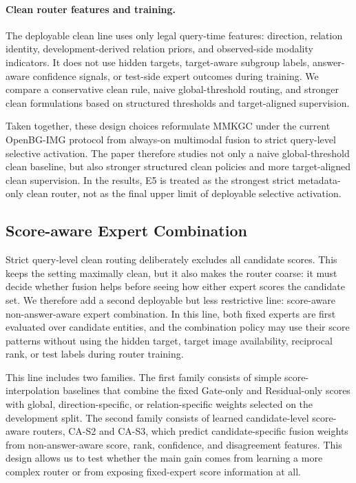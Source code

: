 \documentclass[11pt]{article}
\begin{document}
\paragraph{Clean router features and training.}
The deployable clean line uses only legal query-time features: direction, relation identity, development-derived relation priors, and observed-side modality indicators. It does not use hidden targets, target-aware subgroup labels, answer-aware confidence signals, or test-side expert outcomes during training. We compare a conservative clean rule, naive global-threshold routing, and stronger clean formulations based on structured thresholds and target-aligned supervision.

Taken together, these design choices reformulate MMKGC under the current OpenBG-IMG protocol from always-on multimodal fusion to strict query-level selective activation. The paper therefore studies not only a naive global-threshold clean baseline, but also stronger structured clean policies and more target-aligned clean supervision. In the results, E5 is treated as the strongest strict metadata-only clean router, not as the final upper limit of deployable selective activation.

\subsection{Score-aware Expert Combination}
Strict query-level clean routing deliberately excludes all candidate scores. This keeps the setting maximally clean, but it also makes the router coarse: it must decide whether fusion helps before seeing how either expert scores the candidate set. We therefore add a second deployable but less restrictive line: score-aware non-answer-aware expert combination. In this line, both fixed experts are first evaluated over candidate entities, and the combination policy may use their score patterns without using the hidden target, target image availability, reciprocal rank, or test labels during router training.

This line includes two families. The first family consists of simple score-interpolation baselines that combine the fixed Gate-only and Residual-only scores with global, direction-specific, or relation-specific weights selected on the development split. The second family consists of learned candidate-level score-aware routers, CA-S2 and CA-S3, which predict candidate-specific fusion weights from non-answer-aware score, rank, confidence, and disagreement features. This design allows us to test whether the main gain comes from learning a more complex router or from exposing fixed-expert score information at all.
\end{document}
